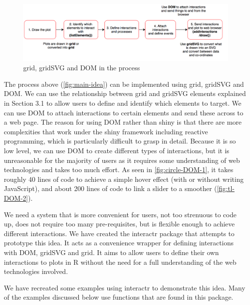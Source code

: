 \documentclass[11pt,]{report}
\begin{document}
\begin{figure}[H]
  
  {\centering \includegraphics[width=0.7\linewidth,]{./fig/main-idea} 
  
  }
  
  \caption{\label{fig:main-idea} grid, gridSVG and DOM in the process}\label{fig:unnamed-chunk-46}
  \end{figure}

The process above (\autoref{fig:main-idea}) can be implemented using
\textsf{grid}, \textsf{gridSVG} and \textsf{DOM}. We can use the
relationship between \textsf{grid} and \textsf{gridSVG} elements
explained in Section 3.1 to allow users to define and identify which
elements to target. We can use \textsf{DOM} to attach interactions to
certain elements and send these across to a web page. The reason for
using \textsf{DOM} rather than shiny is that there are more complexities
that work under the shiny framework including reactive programming,
which is particularly difficult to grasp in detail. Because it is so low
level, we can use \textsf{DOM} to create different types of
interactions, but it is unreasonable for the majority of users as it
requires some understanding of web technologies and takes too much
effort. As seen in \autoref{fig:circle-DOM-1}, it takes roughly 40 lines
of code to achieve a simple hover effect (with or without writing
JavaScript), and about 200 lines of code to link a slider to a smoother
(\autoref{fig:tl-DOM-2}).

We need a system that is more convenient for users, not too strenuous to
code up, does not require too many pre-requisites, but is flexible
enough to achieve different interactions. We have created the
\textsf{interactr} package that attempts to prototype this idea. It acts
as a convenience wrapper for defining interactions with \textsf{DOM},
\textsf{gridSVG} and \textsf{grid}. It aims to allow users to define
their own interactions to plots in R without the need for a full
understanding of the web technologies involved.

We have recreated some examples using \textsf{interactr} to demonstrate
this idea. Many of the examples discussed below use functions that are
found in this package.
\end{document}
